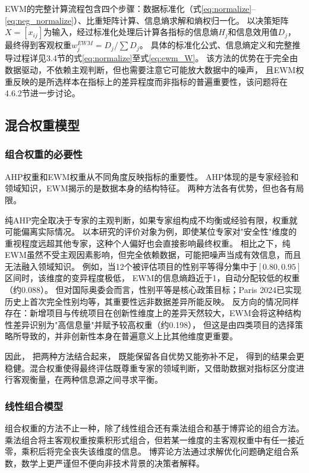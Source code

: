 \documentclass[twoside]{CUGThesis}
\begin{document}
EWM的完整计算流程包含四个步骤：数据标准化（式\eqref{eq:normalize}--\eqref{eq:neg_normalize}）、比重矩阵计算、信息熵求解和熵权归一化。
以决策矩阵$X = [x_{ij}]$为输入，经过标准化处理后计算各指标的信息熵$H_j$和信息效用值$D_j$，
最终得到客观权重$w_j^{EWM} = D_j / \sum D_j$。
具体的标准化公式、信息熵定义和完整推导过程详见3.4节的式\eqref{eq:normalize}至式\eqref{eq:ewm_W}。
该方法的优势在于完全由数据驱动，不依赖主观判断，但也需要注意它可能放大数据中的噪声，
且EWM权重反映的是所选样本在指标上的差异程度而非指标的普遍重要性，该问题将在4.6.2节进一步讨论。

\subsection{混合权重模型}

\subsubsection{组合权重的必要性}

AHP权重和EWM权重从不同角度反映指标的重要性。
AHP体现的是专家经验和领域知识，EWM揭示的是数据本身的结构特征。
两种方法各有优势，但也各有局限。

纯AHP完全取决于专家的主观判断，如果专家组构成不均衡或经验有限，权重就可能偏离实际情况。
以本研究的评价对象为例，即使某位专家对"安全性"维度的重视程度远超其他专家，这种个人偏好也会直接影响最终权重。
相比之下，纯EWM虽然不受主观因素影响，但完全依赖数据，可能把噪声当成有效信息，而且无法融入领域知识。
例如，当12个被评估项目的性别平等得分集中于$[0.80, 0.95]$区间时，该维度的变异程度极低，
EWM的信息熵趋近于1，自动分配较低的权重（约0.088）。
但对国际奥委会而言，性别平等是核心政策目标；Paris 2024已实现历史上首次完全性别均等\cite{IOC2024}，其重要性远非数据差异所能反映。
反方向的情况同样存在：新增项目与传统项目在创新性维度上的差异天然较大，EWM会将这种结构性差异识别为"高信息量"并赋予较高权重（约0.198），
但这是由四类项目的选择策略所导致的，并非创新性本身在普遍意义上比其他维度更重要。

因此，
把两种方法结合起来，
既能保留各自优势又能弥补不足，
得到的结果会更稳健\cite{Zhang2023,Shang2009}。混合权重使得最终评估既尊重专家的领域判断，又借助数据对指标区分度进行客观衡量，在两种信息源之间寻求平衡。

\subsubsection{线性组合模型}

组合权重的方法不止一种，除了线性组合还有乘法组合\cite{He2025}和基于博弈论的组合方法\cite{Zhang2023}。
乘法组合将主客观权重按乘积形式组合，但若某一维度的主客观权重中有任一接近零，乘积后将完全丧失该维度的信息。
博弈论方法通过求解优化问题确定组合系数，数学上更严谨但不便向非技术背景的决策者解释。
\end{document}
